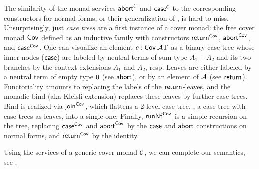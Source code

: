 \documentclass[sigconf,screen,fleqn]{acmart} %
\begin{document}
The similarity of the monad services $\tabort^\C$ and $\tcase^\C$ to
the corresponding constructors for normal forms, or their
generalization of , is hard to miss.
Unsurprisingly, just \emph{case trees} are a first instance of a cover monad:
the free cover monad
$\Cov$ defined
as an inductive family with constructors
$\treturn[\Cov]$, $\tabort^{\Cov}$, and
$\tcase^{\Cov}$.
One can visualize an element $c : \Cov\,\A\,\Gamma$ as a
binary case tree whose inner nodes ($\tcase$) are labeled by neutral terms
of sum type $A_1+A_2$ and its two branches by the context extensions $A_1$
and $A_2$, resp.  Leaves are either
labeled by a neutral term of empty type $\tyzero$ (see $\tabort$),
or by an element of $\A$ (see $\treturn$).  Functoriality amounts to
replacing the labels of the $\treturn$-leaves, and the monadic bind
(aka Kleisli extension) replaces
these leaves by further case trees.  Bind is realized via $\tjoin[\Cov]$,
which flattens a 2-level case tree, \ie, a case tree with case trees as
leaves, into a single one.
Finally, $\trunNf[\Cov]$ is a simple recursion on the tree, replacing $\tcase^{\Cov}$
and $\tabort^{\Cov}$
by the $\tcase$ and $\tabort$ constructions on normal forms, and
$\treturn[\Cov]$ by the identity.

Using the services of a generic cover monad $\C$, we can complete our
semantics, see .
\end{document}
